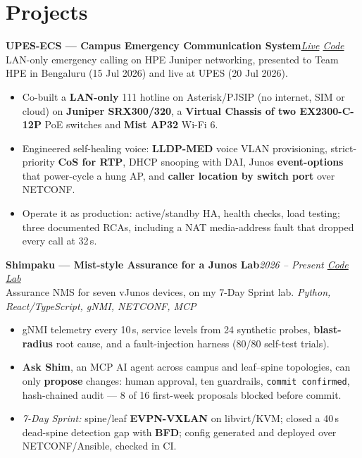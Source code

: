 \documentclass[10pt,a4paper]{article}
\newcommand{\entry}[3]{%
  \textbf{#1}\hfill\textit{\small #2}\\[-0.15em]
  {\small #3}\par\vspace{0.08em}%
}
\begin{document}
\section{Projects}
\entry{UPES-ECS --- Campus Emergency Communication System}{\href{https://upes-ecs.rohanbatra.in}{Live} \textbar{} \href{https://github.com/rohanbatrain/UPES-ECS}{Code}}{LAN-only emergency calling on HPE Juniper networking, presented to Team HPE in Bengaluru (15 Jul 2026) and live at UPES (20 Jul 2026).}
\begin{itemize}
  \item Co-built a \textbf{LAN-only} 111 hotline on Asterisk/PJSIP (no internet, SIM or cloud) on \textbf{Juniper SRX300/320}, a \textbf{Virtual Chassis of two EX2300-C-12P} PoE switches and \textbf{Mist AP32} Wi-Fi 6.
  \item Engineered self-healing voice: \textbf{LLDP-MED} voice VLAN provisioning, strict-priority \textbf{CoS for RTP}, DHCP snooping with DAI, Junos \textbf{event-options} that power-cycle a hung AP, and \textbf{caller location by switch port} over NETCONF.
  \item Operate it as production: active/standby HA, health checks, load testing; three documented RCAs, including a NAT media-address fault that dropped every call at 32\,s.
\end{itemize}

\entry{Shimpaku --- Mist-style Assurance for a Junos Lab}{2026 -- Present \textbar{} \href{https://github.com/rohanbatrain/shimpaku}{Code} \textbar{} \href{https://github.com/rohanbatrain/juniper-7-day-sprint}{Lab}}{Assurance NMS for seven vJunos devices, on my 7-Day Sprint lab. \textit{Python, React/TypeScript, gNMI, NETCONF, MCP}}
\begin{itemize}
  \item gNMI telemetry every 10\,s, service levels from 24 synthetic probes, \textbf{blast-radius} root cause, and a fault-injection harness (80/80 self-test trials).
  \item \textbf{Ask Shim}, an MCP AI agent across campus and leaf--spine topologies, can only \textbf{propose} changes: human approval, ten guardrails, \texttt{commit confirmed}, hash-chained audit --- 8 of 16 first-week proposals blocked before commit.
  \item \textit{7-Day Sprint:} spine/leaf \textbf{EVPN-VXLAN} on libvirt/KVM; closed a 40\,s dead-spine detection gap with \textbf{BFD}; config generated and deployed over NETCONF/Ansible, checked in CI.
\end{itemize}
\end{document}

